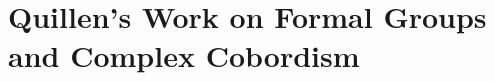 \documentclass[../main]{subfiles}
\begin{document}
\part{Quillen's Work on Formal Groups and Complex Cobordism}\label{part:p2}
\newrefsection
\setcounter{chapter}{-1}%


















\nocite{lazard}

\printbibliography
\end{document}

